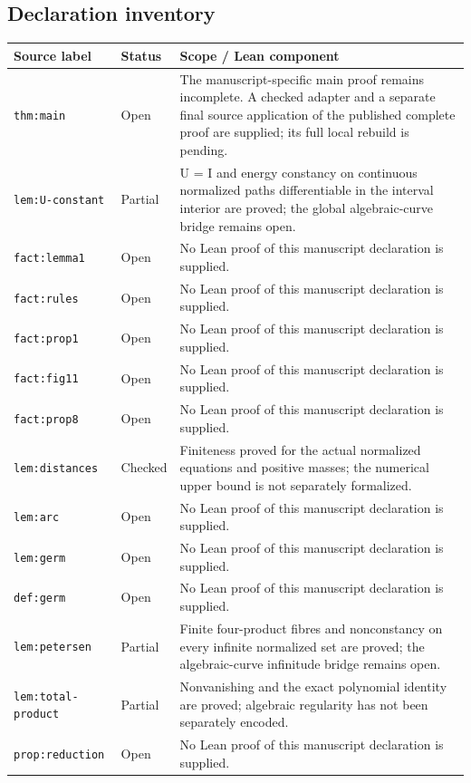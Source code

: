\documentclass[Threeside,11pt]{article}
\theoremstyle{definition}
\theoremstyle{remark}
\numberwithin{equation}{section}
\theoremstyle{remark}
\newcommand{\code}[1]{\begingroup\def\_{\textunderscore\allowbreak}\texttt{#1}\endgroup}
\begin{document}
\subsection{Declaration inventory}
\begingroup\scriptsize
\begin{longtable}{p{4.0cm}p{1.8cm}p{8.9cm}}
\toprule Source label & Status & Scope / Lean component \\
\midrule\endhead
\code{thm:main} & Open & The manuscript-specific main proof remains incomplete. A checked adapter and a separate final source application of the published complete proof are supplied; its full local rebuild is pending. \\
\code{lem:U-constant} & Partial & U = I and energy constancy on continuous normalized paths differentiable in the interval interior are proved; the global algebraic-curve bridge remains open. \\
\code{fact:lemma1} & Open & No Lean proof of this manuscript declaration is supplied. \\
\code{fact:rules} & Open & No Lean proof of this manuscript declaration is supplied. \\
\code{fact:prop1} & Open & No Lean proof of this manuscript declaration is supplied. \\
\code{fact:fig11} & Open & No Lean proof of this manuscript declaration is supplied. \\
\code{fact:prop8} & Open & No Lean proof of this manuscript declaration is supplied. \\
\code{lem:distances} & Checked & Finiteness proved for the actual normalized equations and positive masses; the numerical upper bound is not separately formalized. \\
\code{lem:arc} & Open & No Lean proof of this manuscript declaration is supplied. \\
\code{lem:germ} & Open & No Lean proof of this manuscript declaration is supplied. \\
\code{def:germ} & Open & No Lean proof of this manuscript declaration is supplied. \\
\code{lem:petersen} & Partial & Finite four-product fibres and nonconstancy on every infinite normalized set are proved; the algebraic-curve infinitude bridge remains open. \\
\code{lem:total-product} & Partial & Nonvanishing and the exact polynomial identity are proved; algebraic regularity has not been separately encoded. \\
\code{prop:reduction} & Open & No Lean proof of this manuscript declaration is supplied. \\

\end{longtable}
\end{document}
